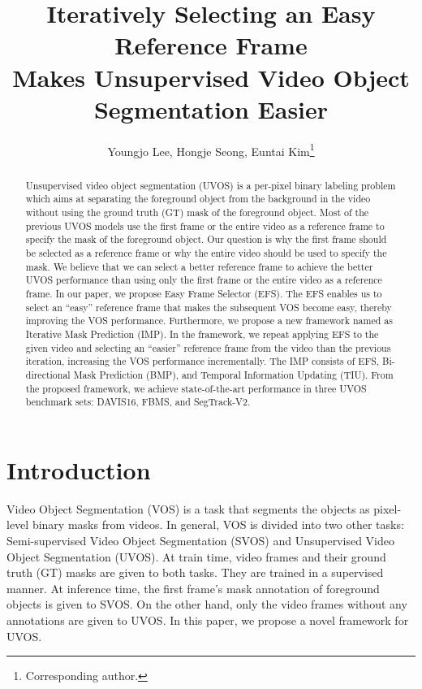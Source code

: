 \documentclass[letterpaper]{article} \usepackage{aaai22}  \usepackage{times}  \usepackage{helvet}  \usepackage{courier}  \usepackage[hyphens]{url}  \usepackage{graphicx} \urlstyle{rm} \def\UrlFont{\rm}  \usepackage{natbib}  \usepackage{caption} \DeclareCaptionStyle{ruled}{labelfont=normalfont,labelsep=colon,strut=off} \frenchspacing  \setlength{\pdfpagewidth}{8.5in}  \setlength{\pdfpageheight}{11in}  \usepackage{algorithm}
\title{Iteratively Selecting an Easy Reference Frame \\Makes Unsupervised Video Object Segmentation Easier}
\author {
Youngjo Lee,
    Hongje Seong,
    Euntai Kim\footnote{Corresponding author.}}
\begin{document}
\maketitle

\begin{abstract}
Unsupervised video object segmentation (UVOS) is a per-pixel binary labeling problem which aims at separating the foreground object from the background in the video without using the ground truth (GT) mask of the foreground object. Most of the previous UVOS models use the first frame or the entire video as a reference frame to specify the mask of the foreground object. Our question is why the first frame should be selected as a reference frame or why the entire video should be used to specify the mask. We believe that we can select a better reference frame to achieve the better UVOS performance than using only the first frame or the entire video as a reference frame. In our paper, we propose Easy Frame Selector (EFS). The EFS enables us to select an ``easy'' reference frame that makes the subsequent VOS become easy, thereby improving the VOS performance. Furthermore, we propose a new framework named as Iterative Mask Prediction (IMP). In the framework, we repeat applying EFS to the given video and selecting an ``easier'' reference frame from the video than the previous iteration, increasing the VOS performance incrementally. The IMP consists of EFS, Bi-directional Mask Prediction (BMP), and Temporal Information Updating (TIU). From the proposed framework, we achieve state-of-the-art performance in three UVOS benchmark sets: DAVIS16, FBMS, and SegTrack-V2.
\end{abstract}


\section{Introduction}

\noindent Video Object Segmentation (VOS) is a task that segments the objects as pixel-level binary masks from videos. In general, VOS is divided into two other tasks: Semi-supervised Video Object Segmentation (SVOS) and Unsupervised Video Object Segmentation (UVOS). At train time, video frames and their ground truth (GT) masks are given to both tasks. They are trained in a supervised manner. 
At inference time, the first frame’s mask annotation of foreground objects is given to SVOS. On the other hand, only the video frames without any annotations are given to UVOS. In this paper, we propose a novel framework for UVOS. 
\end{document}
